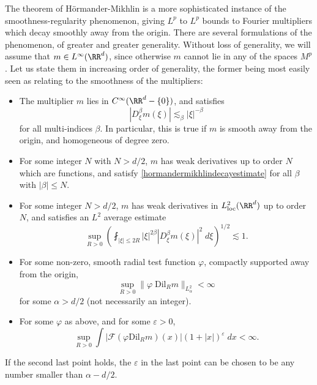 The theorem of H\"{o}rmander-Mikhlin is a more sophisticated instance of the smoothness-regularity phenomenon, giving $L^p$ to $L^p$ bounds to Fourier multipliers which decay smoothly away from the origin. There are several formulations of the phenomenon, of greater and greater generality. Without loss of generality, we will assume that $m \in L^\infty(\RR^d)$, since otherwise $m$ cannot lie in any of the spaces $M^p$. Let us state them in increasing order of generality, the former being most easily seen as relating to the smoothness of the multipliers:
%
\begin{itemize}
    \item The multiplier $m$ lies in $C^\infty(\RR^d - \{ 0 \})$, and satisfies
    \begin{equation} \label{hormandermikhlindecayestimate}
        |D^\beta_\xi m(\xi)| \lesssim_\beta |\xi|^{-\beta}
    \end{equation}
    for all multi-indices $\beta$. In particular, this is true if $m$ is smooth away from the origin, and homogeneous of degree zero.

    \item For some integer $N$ with $N > d/2$, $m$ has weak derivatives up to order $N$ which are functions, and satisfy \eqref{hormandermikhlindecayestimate} for all $\beta$ with $|\beta| \leq N$.

    \item For some integer $N > d/2$, $m$ has weak derivatives in $L^2_{\text{loc}}(\RR^d)$ up to order $N$, and satisfies an $L^2$ average estimate
    \[ \sup_{R > 0} \left( \fint_{|\xi| \leq 2R} |\xi|^{2\beta} |D^\beta_\xi m(\xi)|^2\; d\xi \right)^{1/2} \lesssim 1. \]

    \item For some non-zero, smooth radial test function $\varphi$, compactly supported away from the origin,
    \begin{equation}
        \sup_{R > 0} \| \varphi\; \text{Dil}_R m \|_{L^2_\alpha} < \infty
    \end{equation}
    for some $\alpha > d/2$ (not necessarily an integer).

    \item For some $\varphi$ as above, and for some $\varepsilon > 0$,
    \[ \sup_{R > 0} \int |\mathcal{F}( \varphi \text{Dil}_R m)(x)| (1 + |x|)^{\varepsilon}\; dx < \infty.  \]
\end{itemize}
%
If the second last point holds, the $\varepsilon$ in the last point can be chosen to be any number smaller than $\alpha - d/2$.

